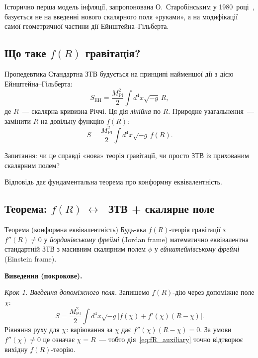Історично перша модель інфляції, запропонована О.~Старобінським у
1980~році~\cite{starobinsky_1980}, базується не на введенні нового
скалярного поля «руками», а на модифікації самої геометричної частини
дії Ейнштейна--Гільберта.

\subsection*{Що таке $f(R)$ гравітація?}

\begin{keybox}{Пропедевтика}
Стандартна ЗТВ будується на принципі
найменшої дії з дією Ейнштейна--Гільберта:
\[
  S_\mathrm{EH} = \frac{M_\mathrm{Pl}^2}{2}\int d^4x\sqrt{-g}\,R,
\]
де $R$~--- скалярна кривизна Річчі. Ця дія \emph{лінійна} по $R$.
Природне узагальнення~--- замінити $R$ на довільну функцію $f(R)$:
\[
  S = \frac{M_\mathrm{Pl}^2}{2}\int d^4x\sqrt{-g}\,f(R).
\]
\end{keybox}

Запитання: чи це справді «нова» теорія гравітації,
чи просто ЗТВ із прихованим скалярним полем?

Відповідь дає фундаментальна теорема про конформну еквівалентність.

\subsection*{Теорема: $f(R) \;\leftrightarrow\; $ ЗТВ + скалярне поле}

\begin{keybox}{Теорема (конформна еквівалентність)}
Будь-яка $f(R)$-теорія гравітації з $f''(R)\neq 0$ у
\emph{йорданівському фреймі} (Jordan frame) математично еквівалентна
стандартній ЗТВ з масивним скалярним полем $\phi$ у
\emph{ейнштейнівському фреймі} (Einstein frame).
\end{keybox}

\textbf{Виведення (покрокове).}

\medskip
\noindent\textit{Крок 1. Введення допоміжного поля.}
Запишемо $f(R)$-дію через допоміжне поле $\chi$:
\begin{equation}\label{eq:fR_auxiliary}
  S = \frac{M_\mathrm{Pl}^2}{2}\int d^4x\sqrt{-g}
      \bigl[f(\chi) + f'(\chi)(R - \chi)\bigr].
\end{equation}
Рівняння руху для $\chi$: варіювання за $\chi$ дає
$f''(\chi)(R-\chi) = 0$.
За умови $f''(\chi)\neq 0$ це означає $\chi = R$~---
тобто дія~\eqref{eq:fR_auxiliary} точно відтворює вихідну $f(R)$-теорію.

